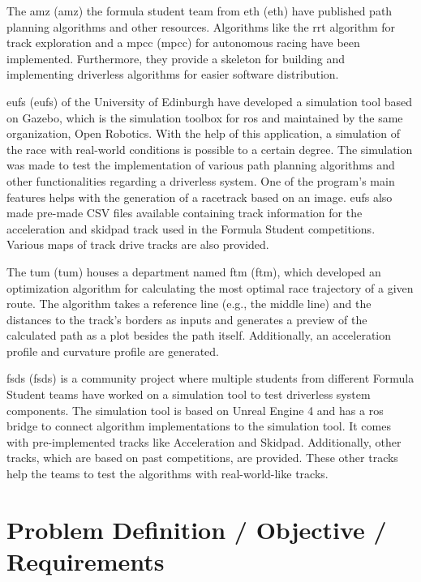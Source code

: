 The \acrshort{amz} (\acrlong{amz}) the formula student team from \acrshort{eth} (\acrlong{eth}) have published path planning algorithms and other resources. Algorithms like the \acrshort{rrt} algorithm for track exploration and a \acrlong{mpcc} (\acrshort{mpcc}) for autonomous racing have been implemented. Furthermore, they provide a skeleton for building and implementing driverless algorithms for easier software distribution.
\cite{amz_racing_github}

\acrlong{eufs} (\acrshort{eufs}) of the University of Edinburgh have developed a simulation tool based on Gazebo, which is the simulation toolbox for \acrshort{ros} and maintained by the same organization, Open Robotics. With the help of this application, a simulation of the race with real-world conditions is possible to a certain degree. The simulation was made to test the implementation of various path planning algorithms and other functionalities regarding a driverless system. One of the program's main features helps with the generation of a racetrack based on an image. \acrshort{eufs} also made pre-made CSV files available containing track information for the acceleration and skidpad track used in the Formula Student competitions. Various maps of track drive tracks are also provided.
\cite{eufs_sim_gitlab}

The \acrlong{tum} (\acrshort{tum}) houses a department named \acrlong{ftm} (\acrshort{ftm}), which developed an optimization algorithm for calculating the most optimal race trajectory of a given route. The algorithm takes a reference line (e.g., the middle line) and the distances to the track's borders as inputs and generates a preview of the calculated path as a plot besides the path itself. Additionally, an acceleration profile and curvature profile are generated.
\cite{tumftm_optimization_algoritm}

\acrlong{fsds} (\acrshort{fsds}) is a community project where multiple students from different Formula Student teams have worked on a simulation tool to test driverless system components. The simulation tool is based on Unreal Engine 4 \cite{unreal_engine} and has a \acrshort{ros} bridge to connect algorithm implementations to the simulation tool. It comes with pre-implemented tracks like Acceleration and Skidpad. Additionally, other tracks, which are based on past competitions, are provided. These other tracks help the teams to test the algorithms with real-world-like tracks.
\cite{fsds_github}

\section{Problem Definition / Objective / Requirements} \label{sec:Problem Definition / Objective / Requirements}
